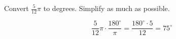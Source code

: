 Convert $\frac{5}{12}\pi$ to degrees. Simplify as much as possible.

$$
\frac{5}{12}\pi \cdot \frac{180^{\circ}}{\pi} = \frac{180^{\circ} \cdot 5}{12} = 75^{\circ}
$$
